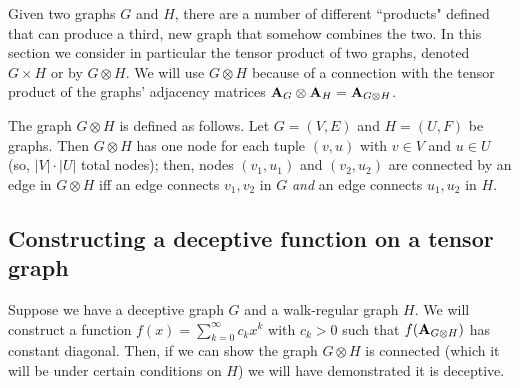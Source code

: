 

Given two graphs $G$ and $H$, there are a number of different ``products" defined that can produce a third, new graph that somehow combines the two. In this section we consider in particular the tensor product of two graphs, denoted $G \times H$ or by $G \otimes H$. We will use $G \otimes H$ because of a connection with the tensor product of the graphs' adjacency matrices $\textbf{A}_{G} \otimes \textbf{A}_{H} = \textbf{A}_{G \otimes H}$.

The graph $G \otimes H$ is defined as follows. Let $G = (V,E)$ and $H = (U,F)$ be graphs. Then $G\otimes H$ has one node for each tuple $(v,u)$ with $v \in V$ and $u \in U$ (so, $|V|\cdot|U|$ total nodes); then, nodes $(v_1, u_1)$ and $(v_2, u_2)$ are connected by an edge in $G \otimes H$ iff an edge connects $v_1, v_2$ in $G$ \emph{and} an edge connects $u_1, u_2$ in $H$.

\subsection{Constructing a deceptive function on a tensor graph}\label{sec:tensor-construction}

Suppose we have a deceptive graph $G$ and a walk-regular graph $H$. We will construct a function $f(x) = \sum_{k=0}^{\infty} c_k x^k$ with $c_k >0$ such that $f( \textbf{A}_{G \otimes H})$ has constant diagonal. Then, if we can show the graph $G \otimes H$ is connected (which it will be under certain conditions on $H$) we will have demonstrated it is deceptive.

